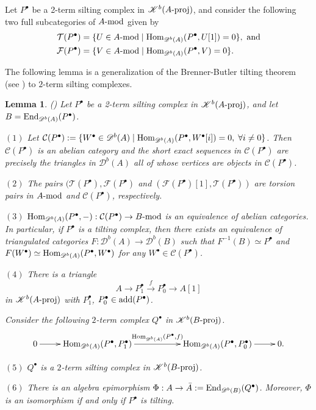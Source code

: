 \documentclass[12pt]{article}
\numberwithin{equation}{section}
\newtheorem{Lem}[Def]{Lemma}
\theoremstyle{definition}
\newcommand{\add}{{\rm add}}
\newcommand{\End}{{\rm End}}
\newcommand{\CC}{{\mathcal C}}
\newcommand{\F}{{\mathcal F}}
\newcommand{\T}{{\mathcal T}}
\newcommand{\Db}[1]{{\mathscr D}^b(#1)}
\newcommand{\Kb}[1]{{\mathscr K}^b(#1)}
\newcommand{\modcat}{\ensuremath{\mbox{{\rm -mod}}}}
\newcommand{\pmodcat}[1]{#1\mbox{{\rm -proj}}}
\newcommand{\Hom}{{\rm Hom}}
\newcommand{\lra}{\longrightarrow}
\newcommand{\lraf}[1]{\stackrel{#1}{\lra}}
\newcommand{\ra}{\rightarrow}
\begin{document}
Let $P^{\bullet}$ be a 2-term silting complex in $\Kb{\pmodcat{A}}$, and consider the following two full subcategories of $A\modcat$ given by
\begin{align*}
\T(P^{\bullet}) & =\{U\in A\modcat \mid \Hom_{\Db{A}}(P^{\bullet},U[1])=0\} ,\mbox{ and}\\
\F(P^{\bullet}) & =\{V\in A\modcat \mid \Hom_{\Db{A}}(P^{\bullet},V)=0\}.
\end{align*}

The following lemma is a generalization of the Brenner-Butler tilting theorem (see \cite{bb79,hr82}) to $2$-term silting complexes.
\begin{Lem}\label{equi}{\rm (\cite{Buan2016})}
Let $P^{\bullet}$ be a 2-term silting complex in $\Kb{\pmodcat{A}}$, and let $B=\End_{\Db{A}}(P^{\bullet})$.

$(1)$ Let $\CC(P^{\bullet}):=\{W^{\bullet}\in \Db{A}\mid \Hom_{\Db{A}}(P^{\bullet},W^{\bullet}[i])=0, \;\forall i\neq 0\}$. Then $\CC(P^{\bullet})$ is an abelian category and the short exact sequences in $\CC(P^{\bullet})$ are precisely the triangles in $\Db{A}$ all of whose vertices are objects in $\CC(P^{\bullet})$.

$(2)$ The pairs $(\T(P^{\bullet}),\F(P^{\bullet})$ and $(\F(P^{\bullet})[1],\T(P^{\bullet}))$ are torsion pairs in $A\modcat$ and $\CC(P^{\bullet})$, respectively.

$(3)$ $\Hom_{\Db{A}}(P^{\bullet},-):\CC(P^{\bullet})\ra B\modcat$ is an equivalence of abelian categories. In particular, if $P^{\bullet}$ is a tilting complex, then there exists an equivalence of triangulated categories $F:\Db{A}\ra \Db{B}$ such that $F^{-1}(B)\simeq P^{\bullet}$ and $F(W^{\bullet})\simeq \Hom_{\Db{A}}(P^{\bullet}, W^{\bullet})$ for any $W^{\bullet}\in \CC(P^{\bullet})$.

$(4)$ There is a triangle
$$A\lra P^{\bullet}_1\lraf{f} P^{\bullet}_0\lra A[1]$$
in $\Kb{\pmodcat{A}}$ with $P^{\bullet}_1$, $P^{\bullet}_0\in \add(P^{\bullet})$.

Consider the following $2$-term complex $Q^{\bullet}$ in $\Kb{\pmodcat{B}}$.
$$\xymatrix{0\ar[r]& \Hom_{\Db{A}}(P^{\bullet}, P^{\bullet}_1)\ar[rr]^{\Hom_{\Db{A}}(P^{\bullet}, f)} &&\Hom_{\Db{A}}(P^{\bullet}, P^{\bullet}_0)\ar[r] &0.}$$

$(5)$ $Q^{\bullet}$ is a $2$-term silting complex in $\Kb{\pmodcat{B}}$.

$(6)$ There is an algebra epimorphism $\Phi:A\ra \bar{A}:=\End_{\Db{B}}(Q^{\bullet})$. Moreover, $\Phi$ is an isomorphism if and only if $P^{\bullet}$ is tilting.


\end{Lem}
\end{document}
